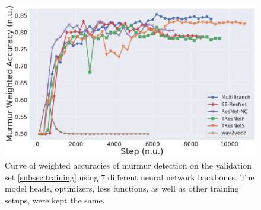 
\begin{figure}[!htp]
\centering
\includegraphics[width=\linewidth]{images/compare_nn.pdf}
\caption{Curve of weighted accuracies of murmur detection on the validation set \ref{subsec:training} using 7 different neural network backbones. The model heads, optimizers, loss functions, as well as other training setups, were kept the same.}
\label{fig:compare_nn}
\end{figure}
